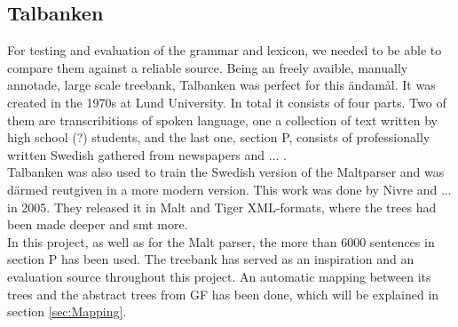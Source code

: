 \documentclass{report}
\begin{document}
%
%


\subsection{Talbanken}
For testing and evaluation of the grammar and lexicon, we needed to be able to
compare them against a reliable source.
Being an freely avaible, manually annotade, large scale treebank,
Talbanken\cite{talbanken} was perfect for this ändamål.
It was created in the 1970s at Lund University. In total it consists of four
parts. Two of them are transcribitions of spoken language, one a collection of
text written by high school (?) students, and the last one, section P,
consists of professionally written Swedish gathered from newspapers and ... .\\
Talbanken was also used to train the Swedish version of the Maltparser\cite{mal}
and was därmed reutgiven in a more modern version\cite{nivre}. This work
was done by Nivre and ... in 2005. They released it in Malt and Tiger XML-formats,
where the trees had been made deeper and smt more. \\
In this project, as well as for the Malt parser, the more than 6000 sentences
in section P has been used.
The treebank has served as an inspiration and an evaluation source throughout this
project. An automatic mapping between its trees and the abstract trees from GF has been
done, which will be explained in section \ref{sec:Mapping}.
\end{document}
